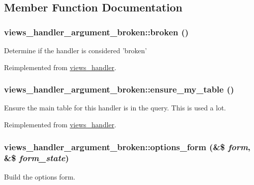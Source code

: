 \subsection{Member Function Documentation}
\hypertarget{classviews__handler__argument__broken_afb6937305424b7b8a2e6fb9e3d4ef1fb}{
\subsubsection[{broken}]{\setlength{\rightskip}{0pt plus 5cm}views\_\-handler\_\-argument\_\-broken::broken ()}}
\label{classviews__handler__argument__broken_afb6937305424b7b8a2e6fb9e3d4ef1fb}
Determine if the handler is considered 'broken' 

Reimplemented from \hyperlink{classviews__handler_ac1cd2ff30cb558c79cc908be516fb725}{views\_\-handler}.\hypertarget{classviews__handler__argument__broken_a479772a6b1f448d4edf3ff3eef988733}{
\subsubsection[{ensure\_\-my\_\-table}]{\setlength{\rightskip}{0pt plus 5cm}views\_\-handler\_\-argument\_\-broken::ensure\_\-my\_\-table ()}}
\label{classviews__handler__argument__broken_a479772a6b1f448d4edf3ff3eef988733}
Ensure the main table for this handler is in the query. This is used a lot. 

Reimplemented from \hyperlink{classviews__handler_a947f21ef0f21a77f4d103af4702b3600}{views\_\-handler}.\hypertarget{classviews__handler__argument__broken_adc6789177dec1350859832bc7b242454}{
\subsubsection[{options\_\-form}]{\setlength{\rightskip}{0pt plus 5cm}views\_\-handler\_\-argument\_\-broken::options\_\-form (\&\$ {\em form}, \/  \&\$ {\em form\_\-state})}}
\label{classviews__handler__argument__broken_adc6789177dec1350859832bc7b242454}
Build the options form. 

